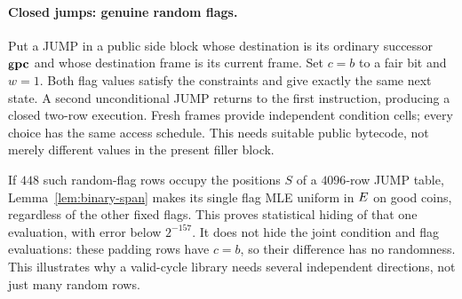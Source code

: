 \paragraph{Closed jumps: genuine random flags.} Put a JUMP in a public side block whose destination is its ordinary successor $\mathsf{g}\mathbf{pc}$ and whose destination frame is its current frame. Set $c=b$ to a fair bit and $w=1$. Both flag values satisfy the constraints and give exactly the same next state. A second unconditional JUMP returns to the first instruction, producing a closed two-row execution. Fresh frames provide independent condition cells; every choice has the same access schedule. This needs suitable public bytecode, not merely different values in the present filler block.

If $448$ such random-flag rows occupy the positions $S$ of a $4096$-row JUMP table, Lemma~\ref{lem:binary-span} makes its single flag MLE uniform in $E$ on good coins, regardless of the other fixed flags. This proves statistical hiding of that one evaluation, with error below $2^{-157}$. It does not hide the joint condition and flag evaluations: these padding rows have $c=b$, so their difference has no randomness. This illustrates why a valid-cycle library needs several independent directions, not just many random rows.

